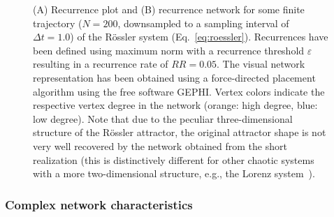 \documentclass[graybox]{svmult}
\begin{document}
\begin{figure}
\centering
{}
\caption{(A) Recurrence plot and (B) recurrence network for some finite trajectory ($N=200$, downsampled to a sampling interval of $\Delta t=1.0$) of the R\"ossler system (Eq.~\ref{eq:roessler}). Recurrences have been defined using maximum norm with a recurrence threshold $\varepsilon$ resulting in a recurrence rate of $RR=0.05$. The visual network representation has been obtained using a force-directed placement algorithm using the free software GEPHI. Vertex colors indicate the respective vertex degree in the network (orange: high degree, blue: low degree). Note that due to the peculiar three-dimensional structure of the R\"ossler attractor, the original attractor shape is not very well recovered by the network obtained from the short realization (this is distinctively different for other chaotic systems with a more two-dimensional structure, e.g., the Lorenz system~\cite{Donner2011IJBC}). %
}
\label{fig:example_rp_rn}
\end{figure}


\subsubsection{Complex network characteristics}\label{sec:rn_measures}
\end{document}

